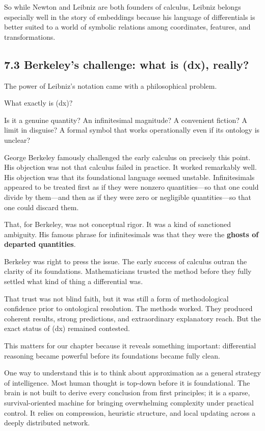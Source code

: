 \documentclass[
]{article}
\begin{document}
So while Newton and Leibniz are both founders of calculus, Leibniz
belongs especially well in the story of embeddings because his language
of differentials is better suited to a world of symbolic relations among
coordinates, features, and transformations.

\hypertarget{berkeleys-challenge-what-is-dx-really}{%
\subsection{7.3 Berkeley's challenge: what is (dx),
really?}\label{berkeleys-challenge-what-is-dx-really}}

The power of Leibniz's notation came with a philosophical problem.

What exactly is (dx)?

Is it a genuine quantity? An infinitesimal magnitude? A convenient
fiction? A limit in disguise? A formal symbol that works operationally
even if its ontology is unclear?

George Berkeley famously challenged the early calculus on precisely this
point. His objection was not that calculus failed in practice. It worked
remarkably well. His objection was that its foundational language seemed
unstable. Infinitesimals appeared to be treated first as if they were
nonzero quantities---so that one could divide by them---and then as if
they were zero or negligible quantities---so that one could discard
them.

That, for Berkeley, was not conceptual rigor. It was a kind of
sanctioned ambiguity. His famous phrase for infinitesimals was that they
were the \textbf{ghosts of departed quantities}.

Berkeley was right to press the issue. The early success of calculus
outran the clarity of its foundations. Mathematicians trusted the method
before they fully settled what kind of thing a differential was.

That trust was not blind faith, but it was still a form of
methodological confidence prior to ontological resolution. The methods
worked. They produced coherent results, strong predictions, and
extraordinary explanatory reach. But the exact status of (dx) remained
contested.

This matters for our chapter because it reveals something important:
differential reasoning became powerful before its foundations became
fully clean.

One way to understand this is to think about approximation as a general
strategy of intelligence. Most human thought is top-down before it is
foundational. The brain is not built to derive every conclusion from
first principles; it is a sparse, survival-oriented machine for bringing
overwhelming complexity under practical control. It relies on
compression, heuristic structure, and local updating across a deeply
distributed network.
\end{document}
